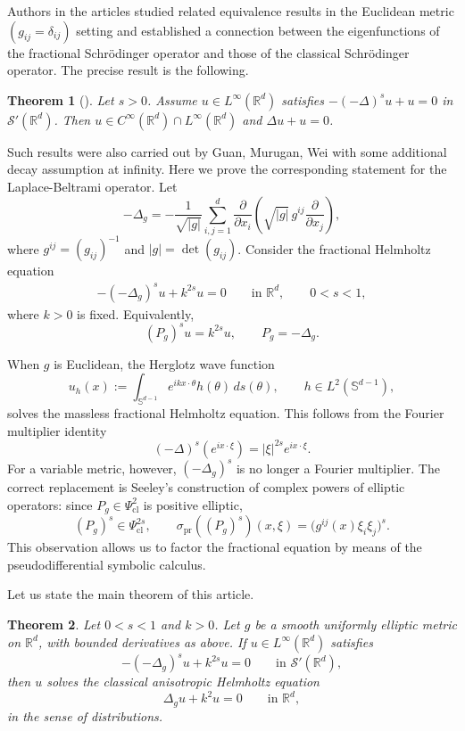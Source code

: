 \documentclass[12pt]{amsart}
\numberwithin{equation}{section}
\newtheorem{thm}{Theorem}[section]
\theoremstyle{definition}
\theoremstyle{remark}
\numberwithin{equation}{section}
\newcommand{\R}{{\mathbb R}}
\begin{document}
	Authors in the articles \cite{cheng2023equivalence,guan2023helmholtz} studied
	related equivalence results in the Euclidean metric
	$(g_{ij}=\delta_{ij})$ setting and established a connection between the
	eigenfunctions of the fractional Schr\"odinger operator and those of the
	classical Schr\"odinger operator. The precise result is the following.
	\begin{thm}[{\cite[Theorem 1.1]{cheng2023equivalence}}]\label{comparability of fractional and local Helmholtz eq, eucleadian metric}
		Let $s>0$. Assume $u\in L^{\infty}(\R^d)$ satisfies $-(-\Delta)^su+u=0$ in $\mathcal{S}'(\R^d)$. Then $u\in C^{\infty}(\R^d)\cap L^{\infty}(\R^d)$ and $\Delta u+u=0$.
	\end{thm}
	Such results were also carried out by Guan, Murugan, Wei
	\cite{guan2023helmholtz} with some additional decay assumption at infinity.
	Here we prove the corresponding statement for the Laplace-Beltrami operator. Let
	\[
	-\Delta_g = -\frac{1}{\sqrt{|g|}} \sum_{i,j=1}^d \frac{\partial}{\partial x_i}
	\left( \sqrt{|g|} \, g^{ij} \frac{\partial}{\partial x_j} \right),
	\]
	where $g^{ij}=(g_{ij})^{-1}$ and $|g|=\det(g_{ij})$. Consider the fractional
	Helmholtz equation
	\begin{align}\label{fractional Helmholtz eq}
		-(-\Delta_g)^s u+k^{2s}u=0
		\qquad \text{in }\R^d, \qquad 0<s<1,
	\end{align}
	where $k>0$ is fixed. Equivalently,
	\[
	(P_g)^s u=k^{2s}u, \qquad P_g=-\Delta_g.
	\]
	
	When $g$ is Euclidean, the Herglotz wave function
	\[
	u_h(x):= \int_{\mathbb{S}^{d-1}} e^{ikx\cdot \theta} h(\theta) \, ds(\theta),
	\qquad h\in L^2(\mathbb{S}^{d-1}),
	\]
	solves the massless fractional Helmholtz equation. This follows from the
	Fourier multiplier identity
	\[
	(-\Delta)^s(e^{ix\cdot\xi})=|\xi|^{2s}e^{ix\cdot\xi}.
	\]
	For a variable metric, however, $(-\Delta_g)^s$ is no longer a Fourier
	multiplier. The correct replacement is Seeley's construction of complex powers
	of elliptic operators: since $P_g\in\Psi^2_{\mathrm{cl}}$ is positive elliptic,
	\[
	(P_g)^s\in\Psi^{2s}_{\mathrm{cl}},
	\qquad
	\sigma_{\mathrm{pr}}((P_g)^s)(x,\xi)=\big(g^{ij}(x)\xi_i\xi_j\big)^s.
	\]
	This observation allows us to factor the fractional equation by means of the
	pseudodifferential symbolic calculus.
	
	Let us state the main theorem of this article.
	\begin{thm}\label{equivalence result}
		Let $0<s<1$ and $k>0$. Let $g$ be a smooth uniformly elliptic metric on
		$\mathbb{R}^d$, with bounded derivatives as above. If
		$u\in L^{\infty}(\mathbb{R}^d)$ satisfies
		\[
		-(-\Delta_g)^s u+k^{2s}u=0
		\qquad \text{in } \mathcal{S}'(\R^d),
		\]
		then $u$ solves the classical anisotropic Helmholtz equation
		\[
		\Delta_g u+k^2u=0
		\qquad \text{in }\R^d,
		\]
		in the sense of distributions.
	\end{thm}
	
\end{document}
